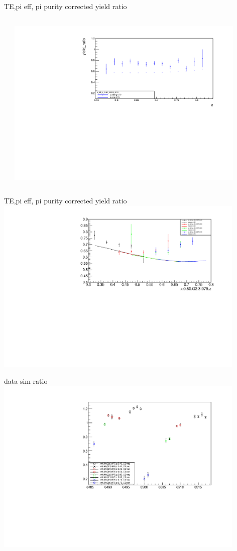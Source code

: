 \begin{frame}{TE,pi eff, pi purity corrected yield ratio}
\begin{columns}
\begin{column}[T]{0.5\textwidth}
\end{column}
\begin{column}[T]{0.5\textwidth}
\includegraphics[width = 0.9\textwidth]{results/yield/statistics_corr/x_Q2_z_50_3979_70_ratio.pdf}
\end{column}
\end{columns}
\end{frame}
\begin{frame}{TE,pi eff, pi purity corrected yield ratio}
\includegraphics[width = 0.9\textwidth]{results/yield/statistics_corr/x_Q2_50_3979_ratio.pdf}
\end{frame}
\begin{frame}{data sim ratio}
    \includegraphics[width = 0.9\textwidth]{results/yield/run_info_pdf/x_Q2_50_3979_data_simc_ratio.pdf}
\end{frame}
